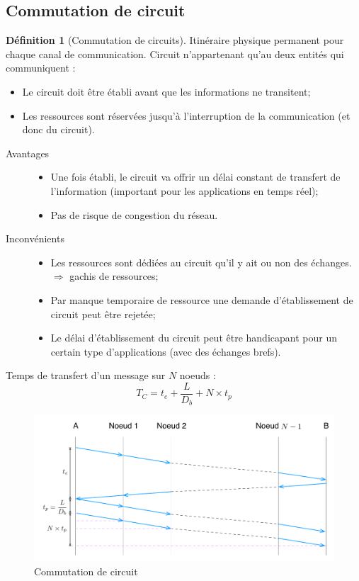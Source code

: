 \documentclass[11pt,english,french]{scrreprt}
\theoremstyle{remark}
\theoremstyle{definition}
\newtheorem*{def*}{Définition}
\begin{document}
\subsection{Commutation de circuit} %

\begin{def*}[Commutation de circuits]
	Itinéraire physique permanent pour chaque canal de communication. Circuit n'appartenant qu'au deux entités qui communiquent :\begin{itemize}
		\item Le circuit doit être établi avant que les informations ne transitent;
		\item Les ressources sont réservées jusqu'à l'interruption de la communication (et donc du circuit).
	\end{itemize} 
\end{def*}

\begin{description}
	\item[Avantages] \hfill \begin{itemize}
		\item Une fois établi, le circuit va offrir un délai constant de transfert de l'information (important pour les applications en temps réel);
		\item Pas de risque de congestion du réseau.
	\end{itemize}
	\item[Inconvénients] \hfill \begin{itemize}
		\item Les ressources sont dédiées au circuit qu'il y ait ou non des échanges.\\ $\Rightarrow$ gachis de ressources;
		\item Par manque temporaire de ressource une demande d'établissement de circuit peut être rejetée;
		\item Le délai d'établissement du circuit peut être handicapant pour un certain type d'applications (avec des échanges brefs).
	\end{itemize}
\end{description}

Temps de transfert d'un message sur $N$ noeuds :
\[
	T_{C}=t_e+\frac{L}{D_{b}}+N\times t_{p}
\]

\begin{figure}[h!]
	\center
	\includegraphics[scale=.7]{graphes/CC}
	\caption{Commutation de circuit}
\end{figure}
\end{document}
